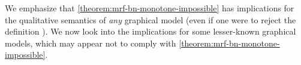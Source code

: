 \begin{subappendices}
We emphasize that \cref{theorem:mrf-bn-monotone-impossible} has implications for the qualitative semantics of \emph{any} graphical model (even if one were to reject the definition \scibility). 
%
We now look into the implications for some lesser-known graphical models, which may appear not to comply with \cref{theorem:mrf-bn-monotone-impossible}.


\end{subappendices}
